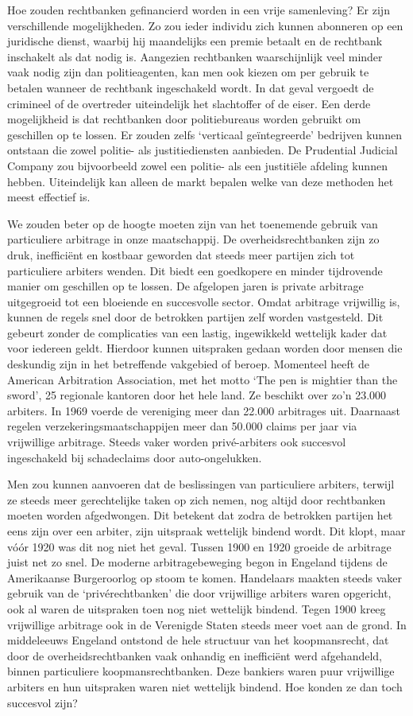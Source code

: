 \documentclass[
  a5paper,
  smalldemyvopaper,10pt,twoside,onecolumn,openright,extrafontsizes,hidelinks]{memoir}
\begin{document}
Hoe zouden rechtbanken gefinancierd worden in een vrije samenleving? Er
zijn verschillende mogelijkheden. Zo zou ieder individu zich kunnen
abonneren op een juridische dienst, waarbij hij maandelijks een premie
betaalt en de rechtbank inschakelt als dat nodig is. Aangezien
rechtbanken waarschijnlijk veel minder vaak nodig zijn dan
politieagenten, kan men ook kiezen om per gebruik te betalen wanneer de
rechtbank ingeschakeld wordt. In dat geval vergoedt de crimineel of de
overtreder uiteindelijk het slachtoffer of de eiser. Een derde
mogelijkheid is dat rechtbanken door politiebureaus worden gebruikt om
geschillen op te lossen. Er zouden zelfs `verticaal geïntegreerde'
bedrijven kunnen ontstaan die zowel politie- als justitiediensten
aanbieden. De Prudential Judicial Company zou bijvoorbeeld zowel een
politie- als een justitiële afdeling kunnen hebben. Uiteindelijk kan
alleen de markt bepalen welke van deze methoden het meest effectief is.

We zouden beter op de hoogte moeten zijn van het toenemende gebruik van
particuliere arbitrage in onze maatschappij. De overheidsrechtbanken
zijn zo druk, inefficiënt en kostbaar geworden dat steeds meer partijen
zich tot particuliere arbiters wenden. Dit biedt een goedkopere en
minder tijdrovende manier om geschillen op te lossen. De afgelopen jaren
is private arbitrage uitgegroeid tot een bloeiende en succesvolle
sector. Omdat arbitrage vrijwillig is, kunnen de regels snel door de
betrokken partijen zelf worden vastgesteld. Dit gebeurt zonder de
complicaties van een lastig, ingewikkeld wettelijk kader dat voor
iedereen geldt. Hierdoor kunnen uitspraken gedaan worden door mensen die
deskundig zijn in het betreffende vakgebied of beroep. Momenteel heeft
de American Arbitration Association, met het motto `The pen is mightier
than the sword', 25 regionale kantoren door het hele land. Ze beschikt
over zo'n 23.000 arbiters. In 1969 voerde de vereniging meer dan 22.000
arbitrages uit. Daarnaast regelen verzekeringsmaatschappijen meer dan
50.000 claims per jaar via vrijwillige arbitrage. Steeds vaker worden
privé-arbiters ook succesvol ingeschakeld bij schadeclaims door
auto-ongelukken.

Men zou kunnen aanvoeren dat de beslissingen van particuliere arbiters,
terwijl ze steeds meer gerechtelijke taken op zich nemen, nog altijd
door rechtbanken moeten worden afgedwongen. Dit betekent dat zodra de
betrokken partijen het eens zijn over een arbiter, zijn uitspraak
wettelijk bindend wordt. Dit klopt, maar vóór 1920 was dit nog niet het
geval. Tussen 1900 en 1920 groeide de arbitrage juist net zo snel. De
moderne arbitragebeweging begon in Engeland tijdens de Amerikaanse
Burgeroorlog op stoom te komen. Handelaars maakten steeds vaker gebruik
van de `privérechtbanken' die door vrijwillige arbiters waren opgericht,
ook al waren de uitspraken toen nog niet wettelijk bindend. Tegen 1900
kreeg vrijwillige arbitrage ook in de Verenigde Staten steeds meer voet
aan de grond. In middeleeuws Engeland ontstond de hele structuur van het
koopmansrecht, dat door de overheidsrechtbanken vaak onhandig en
inefficiënt werd afgehandeld, binnen particuliere koopmansrechtbanken.
Deze bankiers waren puur vrijwillige arbiters en hun uitspraken waren
niet wettelijk bindend. Hoe konden ze dan toch succesvol zijn?
\end{document}
